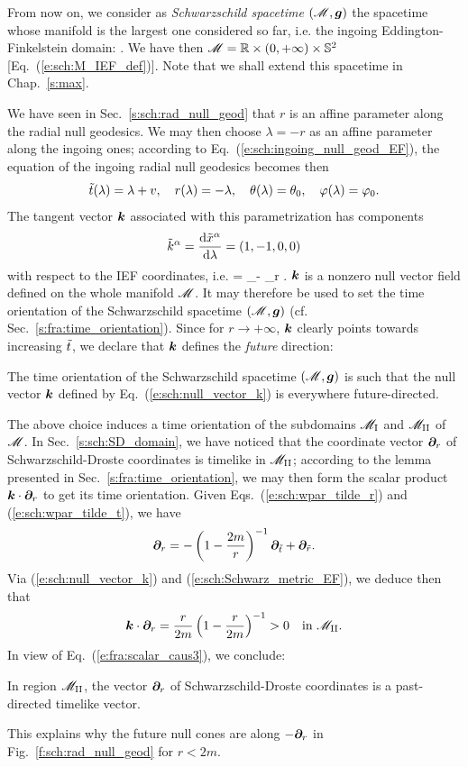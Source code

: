 From now on, we consider as
\emph{Schwarzschild spacetime} $(\mathscr{M},\bm{g})$ the spacetime
whose manifold is the largest one considered so far, i.e. the ingoing Eddington-Finkelstein
domain:
\be \label{s:sch:def_Schwarz_spacetime}
   .
\ee
We have then $\mathscr{M} = \mathbb{R}\times(0,+\infty)\times\mathbb{S}^2$ [Eq.~(\ref{e:sch:M_IEF_def})].
Note that we shall extend this spacetime in Chap.~\ref{s:max}.

We have seen in Sec.~\ref{s:sch:rad_null_geod} that $r$ is an affine parameter
along the radial null geodesics. We may then choose $\lambda=-r$ as an
affine parameter along the ingoing ones; according to
Eq.~(\ref{e:sch:ingoing_null_geod_EF}), the equation of the ingoing radial null geodesics
becomes then
\[
    {\tilde t}(\lambda) = \lambda + v, \quad r(\lambda) = - \lambda, \quad
    \theta(\lambda) = \theta_0,\quad \varphi(\lambda) = \varphi_0 .
\]
The tangent vector $\bm{k}$ associated with this parametrization has components
\[
    {\tilde k}^\alpha = \frac{\mathrm{d} {\tilde x}^\alpha}{\mathrm{d} \lambda}
        = (1, -1, 0, 0)
\]
with respect to the IEF coordinates, i.e.
\be \label{e:sch:null_vector_k}
     = \wpar_\ti - \wpar_{\tilde r} .
\ee
$\bm{k}$ is a nonzero null vector field defined on the whole manifold
$\mathscr{M}$. It may therefore be used to set the time orientation of the Schwarzschild spacetime $(\mathscr{M},\bm{g})$
(cf. Sec.~\ref{s:fra:time_orientation}). Since for $r\rightarrow+\infty$, $\bm{k}$
clearly points towards increasing ${\tilde t}$, we declare that $\bm{k}$ defines
the \emph{future} direction:
\begin{greybox}
The time orientation of the Schwarzschild spacetime $(\mathscr{M}, \bm{g})$ is such
that the null vector $\bm{k}$ defined by Eq.~(\ref{e:sch:null_vector_k})
is everywhere future-directed.
\end{greybox}

The above choice induces a time orientation of the subdomains
$\mathscr{M}_{\rm I}$ and $\mathscr{M}_{\rm II}$ of $\mathscr{M}$.
In Sec.~\ref{s:sch:SD_domain},
we have noticed that the coordinate vector
$\bm{\partial}_r$ of Schwarzschild-Droste coordinates is timelike in $\mathscr{M}_{\rm II}$;
according to the lemma presented in Sec.~\ref{s:fra:time_orientation},
we may then form the scalar product $\bm{k}\cdot\bm{\partial}_r$ to get its time
orientation. Given
Eqs.~(\ref{e:sch:wpar_tilde_r}) and (\ref{e:sch:wpar_tilde_t}), we have
\[
    \bm{\partial}_r = - \left( 1 - \frac{2m}{r} \right) ^{-1} \bm{\partial}_{{\tilde t}}
        + \bm{\partial}_{\tilde r} .
\]
Via (\ref{e:sch:null_vector_k}) and (\ref{e:sch:Schwarz_metric_EF}), we deduce
then that
\[
    \bm{k}\cdot\bm{\partial}_r = \frac{r}{2m} \left( 1 - \frac{r}{2m} \right) ^{-1}
    > 0 \quad\mbox{in} \ \mathscr{M}_{\rm II} .
\]
In view of Eq.~(\ref{e:fra:scalar_caus3}), we conclude:
\begin{greybox}
In region $\mathscr{M}_{\rm II}$, the vector $\bm{\partial}_r$ of Schwarzschild-Droste coordinates
is a past-directed timelike vector.
\end{greybox}
This explains why the future null cones are along $-\bm{\partial}_r$
in Fig.~\ref{f:sch:rad_null_geod} for $r<2m$.

